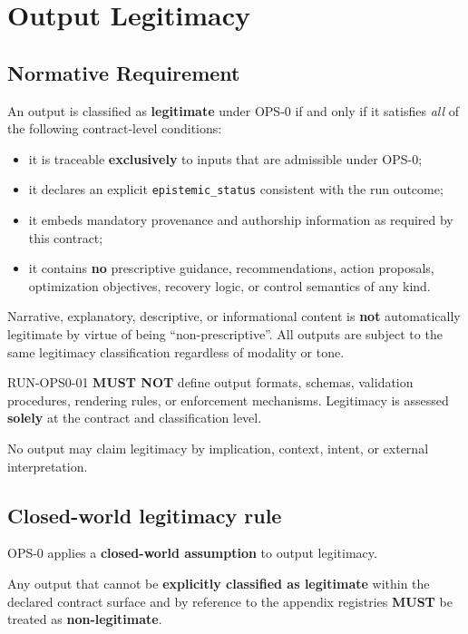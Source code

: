 ﻿\section{Output Legitimacy}

\subsection{Normative Requirement}
An output is classified as \textbf{legitimate} under OPS-0 if and only if it satisfies
\emph{all} of the following contract-level conditions:

\begin{itemize}
  \item it is traceable \textbf{exclusively} to inputs that are admissible under OPS-0;
  \item it declares an explicit \texttt{epistemic\_status} consistent with the run outcome;      
  \item it embeds mandatory provenance and authorship information
        as required by this contract;
  \item it contains \textbf{no} prescriptive guidance, recommendations,
        action proposals, optimization objectives, recovery logic,
        or control semantics of any kind.
\end{itemize}

Narrative, explanatory, descriptive, or informational content
is \textbf{not} automatically legitimate by virtue of being
``non-prescriptive''.
All outputs are subject to the same legitimacy classification
regardless of modality or tone.

RUN-OPS0-01 \textbf{MUST NOT} define output formats, schemas,
validation procedures, rendering rules, or enforcement mechanisms.
Legitimacy is assessed \textbf{solely} at the contract
and classification level.

No output may claim legitimacy by implication,
context, intent, or external interpretation.

\subsection{Closed-world legitimacy rule}
OPS-0 applies a \textbf{closed-world assumption} to output legitimacy.

Any output that cannot be
\textbf{explicitly classified as legitimate}
within the declared contract surface
and by reference to the appendix registries
\textbf{MUST} be treated as \textbf{non-legitimate}.

